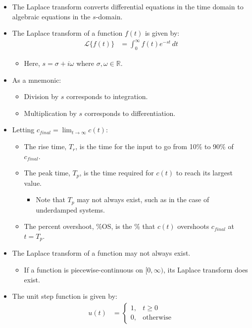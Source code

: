 \documentclass{article}
\newcounter{step}
\begin{document}
\begin{itemize}
	\begin{itemize}
		\item The Laplace transform is used to help make working with differential equations easier.
	\end{itemize}
\item The Laplace transform converts differential equations in the time domain to algebraic equations in the $s$-domain.
	\item The Laplace transform of a function $f(t)$ is given by:
\begin{align*}
	\mathcal{L}\{f(t)\} &= \int_0^\infty f(t) e^{-st} \, dt
\end{align*}

	\begin{itemize}
		\item Here, $s = \sigma + i\omega$ where $\sigma, \omega \in \mathbb{R}$.
	\end{itemize}
	\item As a mnemonic:
	\begin{itemize}
		\item Division by $s$ corresponds to integration.
		\item Multiplication by $s$ corresponds to differentiation.
	\end{itemize}
	\item Letting $c_{final} = \lim_{t \to \infty} c(t)$:
	\begin{itemize}
		\item The rise time, $T_r$, is the time for the input to go from 10\% to 90\% of $c_{final}$.
		\item The peak time, $T_p$, is the time required for $c(t)$ to reach its largest value.
		\begin{itemize}
			\item Note that $T_p$ may not always exist, such as in the case of underdamped systems.
		\end{itemize}
		\item The percent overshoot, \%OS, is the \% that $c(t)$ overshoots $c_{final}$ at $t = T_p$.
	\end{itemize}
	\item The Laplace transform of a function may not always exist.
	\begin{itemize}
		\item If a function is piecewise-continuous on $[0, \infty)$, its Laplace transform does exist.
	\end{itemize}
	\item The unit step function is given by:
\begin{align*}
	u(t) &= \begin{cases} 1, & t \ge 0 \\ 0, & \text{otherwise} \end{cases}
\end{align*}


\end{itemize}
\end{document}
